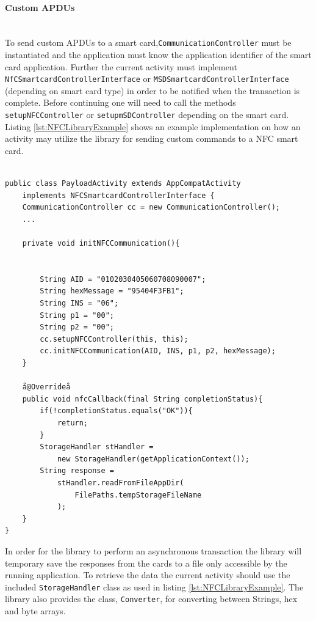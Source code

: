 \paragraph{Custom APDUs}\mbox{}\\
To send custom APDUs to a smart card,\texttt{CommunicationController} must be instantiated and the application must know the application identifier of the smart card application. Further the current activity must implement\\ \texttt{NfCSmartcardControllerInterface} or \texttt{MSDSmartcardControllerInterface} (depending on smart card type) in order to be notified when the transaction is complete. Before continuing one will need to call the methods \texttt{setupNFCController} or \texttt{setupmSDController} depending on the smart card. Listing \ref{lst:NFCLibraryExample} shows an example implementation on how an activity may utilize the library for sending custom commands to a NFC smart card.
\newpage
\begin{lstlisting}[caption=Java code example showing how to send and receive commands to a NFC smart card., label=lst:NFCLibraryExample,escapechar=å]

public class PayloadActivity extends AppCompatActivity
    implements NFCSmartcardControllerInterface {
    CommunicationController cc = new CommunicationController();
    ...

    private void initNFCCommunication(){


        String AID = "0102030405060708090007";
        String hexMessage = "95404F3FB1";
        String INS = "06";
        String p1 = "00";
        String p2 = "00";
        cc.setupNFCController(this, this);
        cc.initNFCCommunication(AID, INS, p1, p2, hexMessage);
    }

    å@Overrideå
    public void nfcCallback(final String completionStatus){
        if(!completionStatus.equals("OK")){
            return;
        }
        StorageHandler stHandler =
            new StorageHandler(getApplicationContext());
        String response =
            stHandler.readFromFileAppDir(
                FilePaths.tempStorageFileName
            );
    }
}

\end{lstlisting}

In order for the library to perform an asynchronous transaction the library will temporary save the responses from the cards to a file only accessible by the running application. To retrieve the data the current activity should use the included \texttt{StorageHandler} class as used in listing \ref{lst:NFCLibraryExample}. The library also provides the class, \texttt{Converter}, for converting between Strings, hex and byte arrays.

